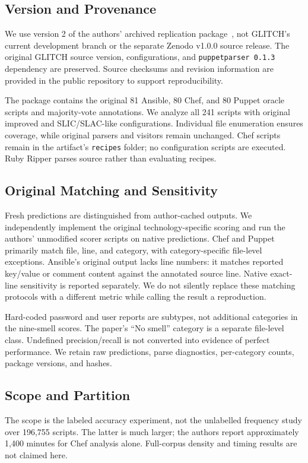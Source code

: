 \documentclass[conference]{IEEEtran}
\begin{document}
\subsection{Version and Provenance}
We use version 2 of the authors' archived replication package~\cite{artifact}, not GLITCH's current development branch or the separate Zenodo v1.0.0 source release. The original GLITCH source version, configurations, and \texttt{puppetparser 0.1.3} dependency are preserved. Source checksums and revision information are provided in the public repository to support reproducibility.

The package contains the original 81 Ansible, 80 Chef, and 80 Puppet oracle scripts and majority-vote annotations. We analyze all 241 scripts with original improved and SLIC/SLAC-like configurations. Individual file enumeration ensures coverage, while original parsers and visitors remain unchanged. Chef scripts remain in the artifact's \texttt{recipes} folder; no configuration scripts are executed. Ruby Ripper parses source rather than evaluating recipes.

\subsection{Original Matching and Sensitivity}
Fresh predictions are distinguished from author-cached outputs. We independently implement the original technology-specific scoring and run the authors' unmodified scorer scripts on native predictions. Chef and Puppet primarily match file, line, and category, with category-specific file-level exceptions. Ansible's original output lacks line numbers: it matches reported key/value or comment content against the annotated source line. Native exact-line sensitivity is reported separately. We do not silently replace these matching protocols with a different metric while calling the result a reproduction.

Hard-coded password and user reports are subtypes, not additional categories in the nine-smell scores. The paper's ``No smell'' category is a separate file-level class. Undefined precision/recall is not converted into evidence of perfect performance. We retain raw predictions, parse diagnostics, per-category counts, package versions, and hashes.

\subsection{Scope and Partition}
The scope is the labeled accuracy experiment, not the unlabelled frequency study over 196,755 scripts. The latter is much larger; the authors report approximately 1,400 minutes for Chef analysis alone. Full-corpus density and timing results are not claimed here.
\end{document}
